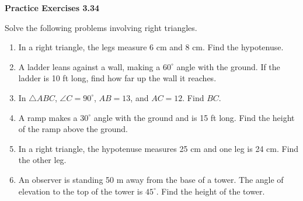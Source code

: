 \vspace{0.3ex}
\noindent\textbf{Practice Exercises 3.34}

\vspace{0.2ex}

Solve the following problems involving right triangles.

\begin{enumerate}[label=\color{blue}\arabic*.]
    \item In a right triangle, the legs measure 6 cm and 8 cm. Find the hypotenuse.
    \item A ladder leans against a wall, making a \(60^\circ\) angle with the ground. If the ladder is 10 ft long, find how far up the wall it reaches.
    \item In \(\triangle ABC\), \(\angle C = 90^\circ\), \(AB = 13\), and \(AC = 12\). Find \(BC\).
    \item A ramp makes a \(30^\circ\) angle with the ground and is 15 ft long. Find the height of the ramp above the ground.
    \item In a right triangle, the hypotenuse measures 25 cm and one leg is 24 cm. Find the other leg.
    \item An observer is standing 50 m away from the base of a tower. The angle of elevation to the top of the tower is \(45^\circ\). Find the height of the tower.
\end{enumerate}
